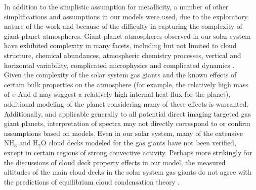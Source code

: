 \documentclass[12pt, letterpaper]{aastex631}
\begin{document}
In addition to the simplistic assumption for metallicity, a number of other simplifications and assumptions in our models were used, due to the exploratory nature of the work and because of the difficulty in capturing the complexity of giant planet atmospheres.  Giant planet atmospheres observed in our solar system have exhibited complexity in many facets, including but not limited to cloud structure, chemical abundances, atmospheric chemistry processes, vertical and horizontal variability, complicated microphysics and complicated dynamics \citep{2014arXiv1403.4436F}.  Given the complexity of the solar system gas giants and the known effects of certain bulk properties on the atmosphere (for example, the relatively high mass of $\upsilon$ And d may suggest a relatively high internal heat flux for the planet), additional modeling of the planet considering many of these effects is warranted. Additionally, and applicable generally to all potential direct imaging targeted gas giant planets, interpretation of spectra may not directly correspond to or confirm assumptions based on models.  Even in our solar system, many of the extensive NH$_{3}$ and H$_{2}$O cloud decks modeled for the gas giants have not been verified, except in certain regions of strong convective activity.  Perhaps more strikingly for the discussions of cloud deck property effects in our model, the measured altitudes of the main cloud decks in the solar system gas giants do not agree with the predictions of equilibrium cloud condensation theory \citep{2014arXiv1403.4436F}.
\end{document}
